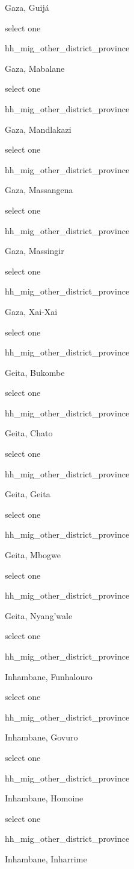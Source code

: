 \documentclass[]{article}
\begin{document}
Gaza, Guijá

select one

hh\_mig\_other\_district\_province

Gaza, Mabalane

select one

hh\_mig\_other\_district\_province

Gaza, Mandlakazi

select one

hh\_mig\_other\_district\_province

Gaza, Massangena

select one

hh\_mig\_other\_district\_province

Gaza, Massingir

select one

hh\_mig\_other\_district\_province

Gaza, Xai-Xai

select one

hh\_mig\_other\_district\_province

Geita, Bukombe

select one

hh\_mig\_other\_district\_province

Geita, Chato

select one

hh\_mig\_other\_district\_province

Geita, Geita

select one

hh\_mig\_other\_district\_province

Geita, Mbogwe

select one

hh\_mig\_other\_district\_province

Geita, Nyang'wale

select one

hh\_mig\_other\_district\_province

Inhambane, Funhalouro

select one

hh\_mig\_other\_district\_province

Inhambane, Govuro

select one

hh\_mig\_other\_district\_province

Inhambane, Homoine

select one

hh\_mig\_other\_district\_province

Inhambane, Inharrime
\end{document}
